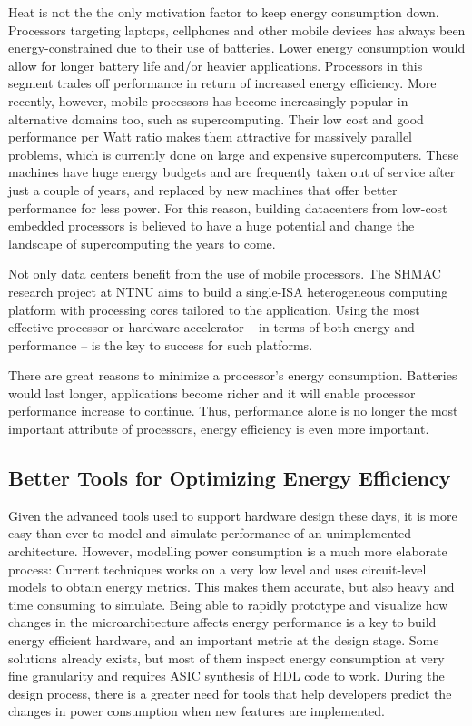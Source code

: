 Heat is not the the only motivation factor to keep energy consumption down.
Processors targeting laptops, cellphones and other mobile devices has always
been energy-constrained due to their use of batteries. Lower energy consumption
would allow for longer battery life and/or heavier applications. Processors in
this segment trades off performance in return of increased energy efficiency.
More recently, however, mobile processors has become increasingly popular in
alternative domains too, such as supercomputing. Their low cost and good
performance per Watt ratio makes them attractive for massively parallel
problems, which is currently done on large and expensive supercomputers. These
machines have huge energy budgets and are frequently taken out of service after
just a couple of years, and replaced by new machines that offer better
performance for less power. For this reason, building datacenters from low-cost
embedded processors is believed to have a huge potential and change the
landscape of supercomputing the years to come.

Not only data centers benefit from the use of mobile processors. The SHMAC
research project at NTNU aims to build a single-ISA heterogeneous computing
platform with processing cores tailored to the application. Using the most
effective processor or hardware accelerator -- in terms of both energy
and performance -- is the key to success for such platforms.

There are great reasons to minimize a processor's energy consumption. Batteries
would last longer, applications become richer and it will enable processor
performance increase to continue. Thus, performance alone is no longer the most
important attribute of processors, energy efficiency is even more important.


\subsection{Better Tools for Optimizing Energy Efficiency}

Given the advanced tools used to support hardware design these days, it is more
easy than ever to model and simulate performance of an unimplemented
architecture. However, modelling power consumption is a much more elaborate
process: Current techniques works on a very low level and uses circuit-level
models to obtain energy metrics. This makes them accurate, but also heavy and
time consuming to simulate. Being able to rapidly prototype and visualize how
changes in the microarchitecture affects energy performance is a key to build
energy efficient hardware, and an important metric at the design stage. Some
solutions already exists, but most of them inspect energy consumption at very
fine granularity and requires ASIC synthesis of HDL code to work. During the
design process, there is a greater need for tools that help developers predict
the changes in power consumption when new features are implemented.


